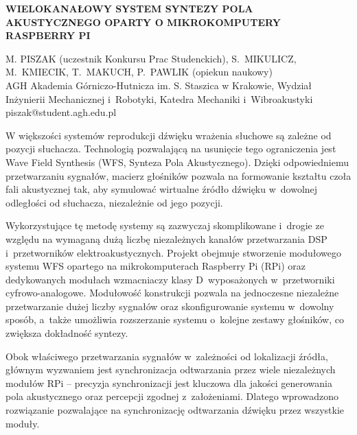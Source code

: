 \documentclass[10pt, a4paper]{article}
\begin{document}
\pagestyle{empty}

\begin{center}
  \large\textbf{\MakeUppercase{Wielokanałowy system syntezy pola akustycznego oparty o mikrokomputery Raspberry Pi}}
\end{center}
\vspace{22pt}

\noindent\MakeUppercase{M. Piszak} (uczestnik Konkursu Prac Studenckich), \MakeUppercase{S.~Mikulicz, M.~Kmiecik,} \linebreak \MakeUppercase{T.~Makuch, P.~Pawlik} (opiekun naukowy)\\

\noindent AGH Akademia Górniczo-Hutnicza im. S. Staszica w Krakowie, Wydział Inżynierii Mechanicznej i~Robotyki, Katedra Mechaniki i~Wibroakustyki
\\

\noindent piszak@student.agh.edu.pl

\vspace{22pt}

W większości systemów reprodukcji dźwięku wrażenia słuchowe są zależne od pozycji słuchacza. Technologią pozwalającą na usunięcie tego ograniczenia jest Wave Field Synthesis (WFS, Synteza Pola Akustycznego). Dzięki odpowiedniemu przetwarzaniu sygnałów, macierz głośników pozwala na formowanie kształtu czoła fali akustycznej tak, aby symulować wirtualne źródło dźwięku w~dowolnej odległości od słuchacza, niezależnie od jego pozycji.

Wykorzystujące tę metodę systemy są zazwyczaj skomplikowane i~drogie ze względu na wymaganą dużą liczbę niezależnych kanałów przetwarzania DSP i~przetworników elektroakustycznych. Projekt obejmuje stworzenie modułowego systemu WFS opartego na mikrokomputerach Raspberry Pi (RPi) oraz dedykowanych modułach wzmacniaczy klasy D~wyposażonych w~przetworniki cyfrowo-analogowe. Modułowość konstrukcji pozwala na jednoczesne niezależne przetwarzanie dużej liczby sygnałów oraz skonfigurowanie systemu w~dowolny sposób, a~także umożliwia rozszerzanie systemu o~kolejne zestawy głośników, co zwiększa dokładność syntezy.

Obok właściwego przetwarzania sygnałów w~zależności od lokalizacji źródła, głównym wyzwaniem jest synchronizacja odtwarzania przez wiele niezależnych modułów RPi -- precyzja synchronizacji jest kluczowa dla jakości generowania pola akustycznego oraz percepcji zgodnej z~założeniami. Dlatego wprowadzono rozwiązanie pozwalające na synchronizację odtwarzania dźwięku przez wszystkie moduły.
\end{document}
